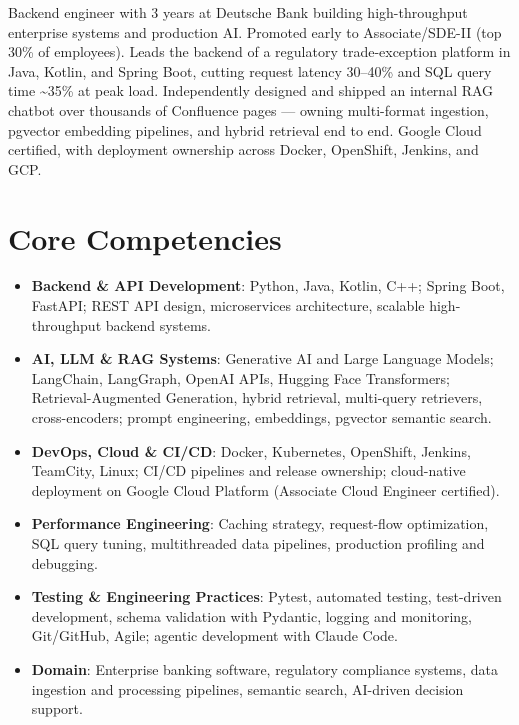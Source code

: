 \documentclass[11pt,a4paper,sans]{moderncv}
\begin{document}
\makecvtitle


\vspace{6pt}
\small{Backend engineer with 3 years at Deutsche Bank building high-throughput enterprise systems and production AI. Promoted early to Associate/SDE-II (top 30\% of employees). Leads the backend of a regulatory trade-exception platform in Java, Kotlin, and Spring Boot, cutting request latency 30--40\% and SQL query time \textasciitilde35\% at peak load. Independently designed and shipped an internal RAG chatbot over thousands of Confluence pages --- owning multi-format ingestion, pgvector embedding pipelines, and hybrid retrieval end to end. Google Cloud certified, with deployment ownership across Docker, OpenShift, Jenkins, and GCP.}


\section{Core Competencies}
\vspace{1pt}
\begin{itemize}

\item \textbf{Backend \& API Development}: Python, Java, Kotlin, C++; Spring Boot, FastAPI; REST API design, microservices architecture, scalable high-throughput backend systems.

\item \textbf{AI, LLM \& RAG Systems}: Generative AI and Large Language Models; LangChain, LangGraph, OpenAI APIs, Hugging Face Transformers; Retrieval-Augmented Generation, hybrid retrieval, multi-query retrievers, cross-encoders; prompt engineering, embeddings, pgvector semantic search.

\item \textbf{DevOps, Cloud \& CI/CD}: Docker, Kubernetes, OpenShift, Jenkins, TeamCity, Linux; CI/CD pipelines and release ownership; cloud-native deployment on Google Cloud Platform (Associate Cloud Engineer certified).

\item \textbf{Performance Engineering}: Caching strategy, request-flow optimization, SQL query tuning, multithreaded data pipelines, production profiling and debugging.

\item \textbf{Testing \& Engineering Practices}: Pytest, automated testing, test-driven development, schema validation with Pydantic, logging and monitoring, Git/GitHub, Agile; agentic development with Claude Code.

\item \textbf{Domain}: Enterprise banking software, regulatory compliance systems, data ingestion and processing pipelines, semantic search, AI-driven decision support.

\end{itemize}
\end{document}
